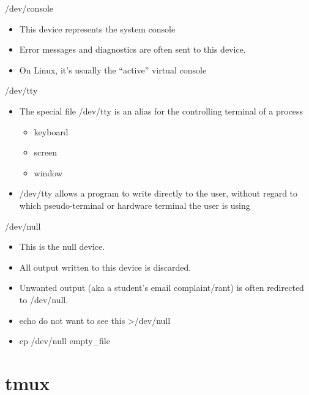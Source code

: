 \documentclass{beamer}
\begin{document}
\begin{frame}{/dev/console}
\begin{itemize}
\item This device represents the system console
\item Error messages and diagnostics are often sent to this device.
\item On Linux, it's usually the ``active'' virtual console
\end{itemize}
\end{frame}

\begin{frame}{/dev/tty}
\begin{itemize}
\item The special file /dev/tty is an alias for the controlling terminal of a process
\begin{itemize}
\item keyboard
\item screen
\item window
\end{itemize}
\item /dev/tty allows a program to write directly to the user, without regard to which pseudo-terminal or hardware terminal the user is using
\end{itemize}
\end{frame}

\begin{frame}{/dev/null}
\begin{itemize}
\item This is the null device.
\item All output written to this device is discarded.
\item Unwanted output (aka a student's email complaint/rant) is often redirected to /dev/null.
\item echo do not want to see this >/dev/null
\item cp /dev/null empty\_file
\end{itemize}
\end{frame}

\section{tmux}
\end{document}

